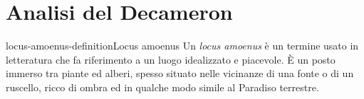 \documentclass[preview]{standalone}
\begin{document}
\genpage

\section{Analisi del Decameron}


\begin{snippetdefinition}{locus-amoenus-definition}{Locus amoenus}
    Un \textit{locus amoenus} è un termine usato in letteratura
    che fa riferimento a un luogo idealizzato e piacevole.
    È un posto immerso tra piante ed alberi,
    spesso situato nelle vicinanze di una fonte o di un ruscello,
    ricco di ombra ed in qualche modo simile al Paradiso terrestre. 
\end{snippetdefinition}
\end{document}
